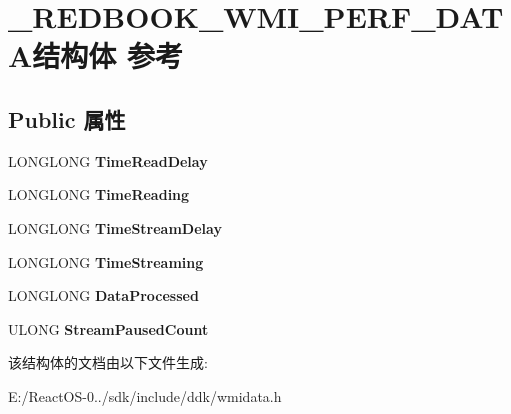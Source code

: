 \hypertarget{struct___r_e_d_b_o_o_k___w_m_i___p_e_r_f___d_a_t_a}{}\section{\+\_\+\+R\+E\+D\+B\+O\+O\+K\+\_\+\+W\+M\+I\+\_\+\+P\+E\+R\+F\+\_\+\+D\+A\+T\+A结构体 参考}
\label{struct___r_e_d_b_o_o_k___w_m_i___p_e_r_f___d_a_t_a}
\subsection*{Public 属性}
\begin{DoxyCompactItemize}
\item 
\mbox{\label{struct___r_e_d_b_o_o_k___w_m_i___p_e_r_f___d_a_t_a_a2813cdc485b71c30c999370ccbeddde7}} 
L\+O\+N\+G\+L\+O\+NG {\bfseries Time\+Read\+Delay}
\item 
\mbox{\label{struct___r_e_d_b_o_o_k___w_m_i___p_e_r_f___d_a_t_a_a3c2dd61eda14742d8f30f694b2f0e658}} 
L\+O\+N\+G\+L\+O\+NG {\bfseries Time\+Reading}
\item 
\mbox{\label{struct___r_e_d_b_o_o_k___w_m_i___p_e_r_f___d_a_t_a_a0d87f46d0e7af4854a9ce1b09de25717}} 
L\+O\+N\+G\+L\+O\+NG {\bfseries Time\+Stream\+Delay}
\item 
\mbox{\label{struct___r_e_d_b_o_o_k___w_m_i___p_e_r_f___d_a_t_a_a25dfe38fdaa96bf5f13ebd7804a8d5bf}} 
L\+O\+N\+G\+L\+O\+NG {\bfseries Time\+Streaming}
\item 
\mbox{\label{struct___r_e_d_b_o_o_k___w_m_i___p_e_r_f___d_a_t_a_a98d62b39f0a7c6283e55d79a239f2949}} 
L\+O\+N\+G\+L\+O\+NG {\bfseries Data\+Processed}
\item 
\mbox{\label{struct___r_e_d_b_o_o_k___w_m_i___p_e_r_f___d_a_t_a_aff187a4b1270a5cb1000db8cf6ab4756}} 
U\+L\+O\+NG {\bfseries Stream\+Paused\+Count}
\end{DoxyCompactItemize}


该结构体的文档由以下文件生成\+:\begin{DoxyCompactItemize}
\item 
E\+:/\+React\+O\+S-\/0../sdk/include/ddk/wmidata.\+h\end{DoxyCompactItemize}
